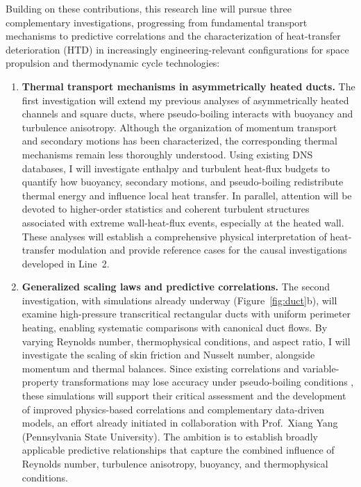 \documentclass[11pt]{article}
\begin{document}
Building on these contributions, this research line will pursue three complementary investigations, progressing from fundamental transport mechanisms to predictive correlations and the characterization of heat-transfer deterioration (HTD) in increasingly engineering-relevant configurations for space propulsion and thermodynamic cycle technologies:
\begin{enumerate}
	\item \textbf{Thermal transport mechanisms in asymmetrically heated ducts.}
	The first investigation will extend my previous analyses of asymmetrically heated channels and square ducts, where pseudo-boiling interacts with buoyancy and turbulence anisotropy.
	Although the organization of momentum transport and secondary motions has been characterized, the corresponding thermal mechanisms remain less thoroughly understood.
	Using existing DNS databases, I will investigate enthalpy and turbulent heat-flux budgets to quantify how buoyancy, secondary motions, and pseudo-boiling redistribute thermal energy and influence local heat transfer.
	In parallel, attention will be devoted to higher-order statistics and coherent turbulent structures associated with extreme wall-heat-flux events, especially at the heated wall.
	These analyses will establish a comprehensive physical interpretation of heat-transfer modulation and provide reference cases for the causal investigations developed in Line~2.
	
	\item \textbf{Generalized scaling laws and predictive correlations.}
	The second investigation, with simulations already underway (Figure~\ref{fig:duct}b), will examine high-pressure transcritical rectangular ducts with uniform perimeter heating, enabling systematic comparisons with canonical duct flows.
	By varying Reynolds number, thermophysical conditions, and aspect ratio, I will investigate the scaling of skin friction and Nusselt number, alongside momentum and thermal balances.
	Since existing correlations and variable-property transformations may lose accuracy under pseudo-boiling conditions \cite{Modesti2026,Li2025}, these simulations will support their critical assessment and the development of improved physics-based correlations and complementary data-driven models, an effort already initiated in collaboration with Prof.~Xiang Yang (Pennsylvania State University).
	The ambition is to establish broadly applicable predictive relationships that capture the combined influence of Reynolds number, turbulence anisotropy, buoyancy, and thermophysical conditions.
	

\end{enumerate}
\end{document}
